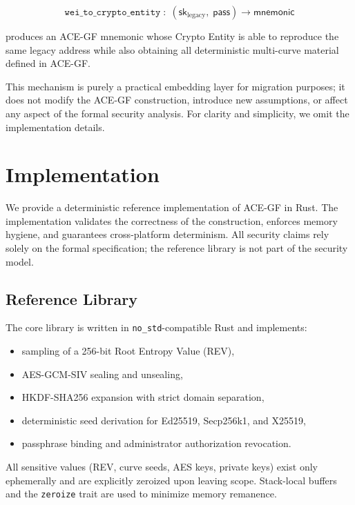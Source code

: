 \documentclass[12pt,a4paper]{article}
\begin{document}
  \[
   \texttt{wei\_to\_crypto\_entity}
   \;:\;
   (\mathsf{sk}_{\mathrm{legacy}},\; \mathsf{pass})
   \longrightarrow
   \mathsf{mnemonic}
  \]

  produces an ACE-GF mnemonic whose Crypto Entity is able to reproduce the
  same legacy address while also obtaining all deterministic multi-curve
  material defined in ACE-GF.

  This mechanism is purely a practical embedding layer for migration
  purposes; it does not modify the ACE-GF construction, introduce new
  assumptions, or affect any aspect of the formal security analysis.
  For clarity and simplicity, we omit the implementation details.


  \section{Implementation}

  We provide a deterministic reference implementation of ACE-GF in Rust.
  The implementation validates the correctness of the construction, enforces
  memory hygiene, and guarantees cross-platform determinism. All security
  claims rely solely on the formal specification; the reference library is
  not part of the security model.

  \subsection{Reference Library}

  The core library is written in \texttt{no\_std}-compatible Rust and
  implements:

  \begin{itemize}
   \item sampling of a 256-bit Root Entropy Value (REV),
   \item AES-GCM-SIV sealing and unsealing,
   \item HKDF-SHA256 expansion with strict domain separation,
   \item deterministic seed derivation for Ed25519, Secp256k1, and X25519,
   \item passphrase binding and administrator authorization revocation.
  \end{itemize}

  All sensitive values (REV, curve seeds, AES keys, private keys) exist only
  ephemerally and are explicitly zeroized upon leaving scope. Stack-local
  buffers and the \texttt{zeroize} trait are used to minimize memory
  remanence.
\end{document}
